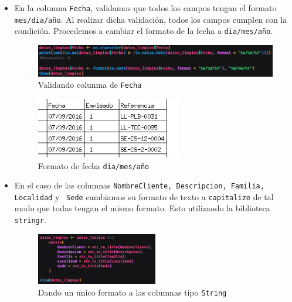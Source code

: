 \documentclass[12pt]{article}
\begin{document}
\begin{itemize}
                \item En la columna \texttt{Fecha}, validamos que todos los campos tengan el formato \texttt{mes/dia/año}. Al realizar dicha validación, todos los campos cumplen con la condición. Procedemos a cambiar el formato de la fecha a \texttt{dia/mes/año}.
                    \begin{figure}[h]
                        \centering 
                        \includegraphics[width=1\textwidth]{img/limpieza-10.png}
                        \caption{Validando colunma de \texttt{Fecha}}
                    \end{figure}

                    \begin{figure}[h]
                        \centering 
                        \includegraphics[width=0.6\textwidth]{img/limpieza-11.png}
                        \caption{Formato de fecha \texttt{dia/mes/año}}
                    \end{figure}
                
                
                \item En el caso de las columnas \texttt{NombreCliente, Descripcion, Familia, Localidad} y \texttt{ Sede} cambiamos su formato de texto a \texttt{capitalize} de tal modo que todas tengan el mismo formato. Esto utilizando la biblioteca \texttt{stringr}.
                    \newpage    
                    \begin{figure}[h]
                        \centering 
                        \includegraphics[width=0.5\textwidth]{img/limpieza-12.png}
                        \caption{Dando un unico formato a las columnas tipo \texttt{String}}
                    \end{figure}


\end{itemize}
\end{document}
